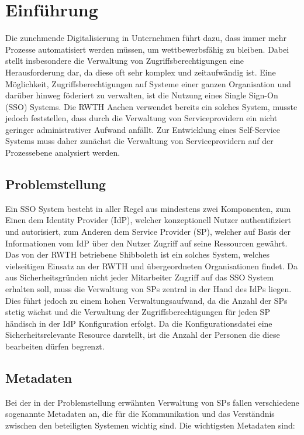 \documentclass[a4paper, fontsize=11pt]{scrartcl}
\begin{document}


\tableofcontents
\newpage


\section{Einführung}\label{sec:einfuehrung}
Die zunehmende Digitalisierung in Unternehmen führt dazu, dass immer mehr Prozesse automatisiert werden müssen, um wettbewerbsfähig zu bleiben.
Dabei stellt insbesondere die Verwaltung von Zugriffsberechtigungen eine Herausforderung dar, da diese oft sehr komplex und zeitaufwändig ist.
Eine Möglichkeit, Zugriffsberechtigungen auf Systeme einer ganzen Organisation und darüber hinweg föderiert zu verwalten, ist die Nutzung eines Single Sign-On (SSO) Systems.
Die RWTH Aachen verwendet bereits ein solches System, musste jedoch feststellen, dass durch die Verwaltung von Serviceprovidern ein nicht geringer administrativer Aufwand anfällt.
Zur Entwicklung eines Self-Service Systems muss daher zunächst die Verwaltung von Serviceprovidern auf der Prozessebene analysiert werden.

\subsection{Problemstellung}\label{subsec:problemstellung}
Ein SSO System besteht in aller Regel aus mindestens zwei Komponenten, zum Einen dem Identity Provider (IdP), welcher konzeptionell Nutzer authentifiziert und autorisiert, zum Anderen dem Service Provider (SP), welcher auf Basis der Informationen vom IdP über den Nutzer Zugriff auf seine Ressourcen gewährt.
Das von der RWTH betriebene Shibboleth ist ein solches System, welches vielseitigen Einsatz an der RWTH und übergeordneten Organisationen findet.
Da aus Sicherheitsgründen nicht jeder Mitarbeiter Zugriff auf das SSO System erhalten soll, muss die Verwaltung von SPs zentral in der Hand des IdPs liegen. 
Dies führt jedoch zu einem hohen Verwaltungsaufwand, da die Anzahl der SPs stetig wächst und die Verwaltung der Zugriffsberechtigungen für jeden SP händisch in der IdP Konfiguration erfolgt.
Da die Konfigurationsdatei eine Sicherheitsrelevante Resource darstellt, ist die Anzahl der Personen die diese bearbeiten dürfen begrenzt.

\subsection{Metadaten}
Bei der in der Problemstellung erwähnten Verwaltung von SPs fallen verschiedene sogenannte Metadaten an, die für die Kommunikation und das Verständnis zwischen den beteiligten Systemen wichtig sind. Die wichtigsten Metadaten sind:
\end{document}
